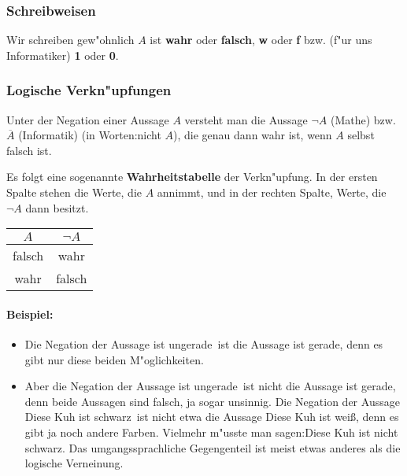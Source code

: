 \subsubsection*{Schreibweisen}
Wir schreiben gew"ohnlich $A$ ist \textbf{wahr} oder \textbf{falsch}, \textbf{w} oder \textbf{f} bzw. (f"ur uns Informatiker) \textbf{1} oder \textbf{0}.

\subsubsection{Logische Verkn"upfungen}
\begin{definition}[Negation]
Unter der Negation einer Aussage $A$ versteht man die Aussage $\neg A$ (Mathe) bzw. $\overline{A}$ (Informatik) (in Worten:\glqq nicht $A$\grqq ), die genau dann wahr ist, wenn $A$ selbst falsch ist.
\end{definition}
Es folgt eine sogenannte \textbf{Wahrheitstabelle} der Verkn"upfung. In der ersten Spalte stehen die Werte, die $A$ annimmt, und in der rechten Spalte, Werte, die $\neg A$ dann besitzt.
\begin{center}
\begin{tabular}{c||c}
 $A$ & $\neg A$  \\ 
\hline
\cellcolor{ared}falsch  & \cellcolor{agreen}wahr   \\ 
\cellcolor{agreen}wahr  & \cellcolor{ared} falsch  \\ 
\hline
\end{tabular}
\end{center}

\paragraph*{Beispiel:}
\begin{itemize}
	\item Die Negation der Aussage  ist ungerade\grqq \ ist die Aussage  ist gerade\grqq , denn es gibt nur diese beiden M"oglichkeiten.
	\item Aber die Negation der Aussage  ist ungerade\grqq \ ist nicht die Aussage  ist gerade\grqq, denn beide Aussagen sind falsch, ja sogar unsinnig. Die Negation der Aussage \glqq Diese Kuh ist schwarz\grqq \ ist nicht etwa die Aussage \glqq Diese Kuh ist wei{\ss}\grqq , denn es gibt ja noch andere Farben. Vielmehr m"usste man sagen:\glqq Diese Kuh ist nicht schwarz\grqq. Das umgangssprachliche Gegengenteil ist meist etwas anderes als die logische Verneinung.
\end{itemize}

